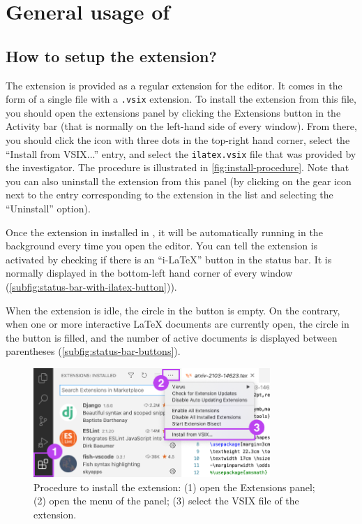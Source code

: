 \documentclass[11pt, a4paper]{article}
\begin{document}
\newpage
\section{General usage of \iLaTeX{}}

\subsection{How to setup the \iLaTeX{} extension?}
The \iLaTeX{} extension is provided as a regular extension for the \vsc editor.
It comes in the form of a single file with a \texttt{.vsix} extension.
To install the extension from this file, you should open the extensions panel by clicking the Extensions button in the Activity bar (that is normally on the left-hand side of every \vsc window). From there, you should click the icon with three dots in the top-right hand corner, select the ``Install from VSIX...'' entry, and select the \texttt{ilatex.vsix} file that was provided by the investigator.
The procedure is illustrated in \autoref{fig:install-procedure}.
Note that you can also uninstall the extension from this panel (by clicking on the gear icon next to the entry corresponding to the \iLaTeX{} extension in the list and selecting the ``Uninstall'' option).

Once the \iLaTeX{} extension in installed in \vsc, it will be automatically running in the background every time you open the editor.
You can tell the \iLaTeX{} extension is activated by checking if there is an ``i-LaTeX'' button in the status bar.
It is normally displayed in the bottom-left hand corner of every \vsc window (\autoref{subfig:status-bar-with-ilatex-button})).

When the extension is idle, the circle in the button is empty.
On the contrary, when one or more interactive \LaTeX{} documents are currently open, the circle in the button is filled, and the number of active documents is displayed between parentheses (\autoref{subfig:status-bar-buttons}).

\begin{figure}[b!]
    \centering
    \includegraphics[width=0.8\textwidth]{img/installation-procedure.png}
    \caption{Procedure to install the \iLaTeX{} extension: (1) open the Extensions panel; (2) open the menu of the panel; (3) select the VSIX file of the extension.}
    \label{fig:install-procedure}
\end{figure}
\end{document}
